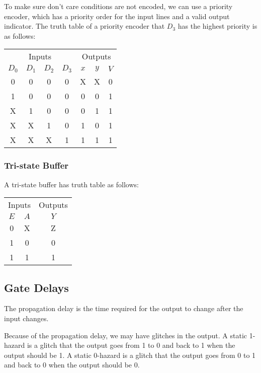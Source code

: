 \documentclass[a4paper,12pt]{article}
\begin{document}
To make sure don't care conditions are not encoded, we can use a priority encoder, which has a priority order for the input lines and a valid output indicator.
The truth table of a priority encoder that $D_3$ has the highest priority is as follows:
\begin{center}
	\begin{tabular}{ccccccc}
		\toprule
		\multicolumn{4}{c}{Inputs} & \multicolumn{3}{c}{Outputs} \\
		\cmidrule(lr){1-4} \cmidrule(lr){5-7}
		$D_0$ & $D_1$ & $D_2$ & $D_3$ & $x$ & $y$ & $V$ \\
		\midrule
		0 & 0 & 0 & 0 & X & X & 0 \\
		1 & 0 & 0 & 0 & 0 & 0 & 1 \\
		X & 1 & 0 & 0 & 0 & 1 & 1 \\
		X & X & 1 & 0 & 1 & 0 & 1 \\
		X & X & X & 1 & 1 & 1 & 1 \\
		\bottomrule
	\end{tabular}
\end{center}

\subsubsection{Tri-state Buffer}

A tri-state buffer has truth table as follows:
\begin{center}
	\begin{tabular}{ccc}
		\toprule
		\multicolumn{2}{c}{Inputs} & Outputs \\
		\cmidrule(lr){1-2} \cmidrule(lr){3-3}
		$E$ & $A$ & $Y$\\
		\midrule
		0 & X & Z \\
		1 & 0 & 0 \\
		1 & 1 & 1 \\
		\bottomrule
	\end{tabular}
\end{center}

\subsection{Gate Delays}

The propagation delay is the time required for the output to change after the input changes.

Because of the propagation delay, we may have glitches in the output.
A static 1-hazard is a glitch that the output goes from 1 to 0 and back to 1 when the output should be 1.
A static 0-hazard is a glitch that the output goes from 0 to 1 and back to 0 when the output should be 0.
\end{document}
